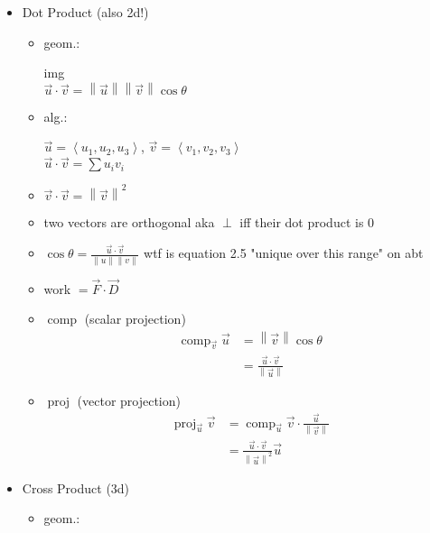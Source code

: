 \documentclass[11pt]{article}
\theoremstyle{definition}
\newcommand{\col}[1]{\begin{minipage}{\columnwidth}#1\end{minipage}}
\newcommand{\magn}[1]{\left\lVert #1 \right\rVert}
\DeclareMathOperator{\proj}{proj}
\DeclareMathOperator{\comp}{comp}
\begin{document}
\begin{multicols}{2}
  \col{
    \begin{itemize}
      \item Dot Product (also 2d!)
      \begin{itemize}
        \item geom.:
        
        img \\
        $\vec{u} \cdot \vec{v} = \magn{\vec{u}} \magn{\vec{v}}\cos \theta$
        \item alg.:
        
        $\vec{u} = \left< u_1, u_2, u_3 \right>$, 
        $\vec{v} = \left< v_1, v_2, v_3 \right>$\\
        $\vec{u} \cdot \vec{v} = \sum u_i v_i$
        \item $\vec{v}\cdot\vec{v} = \magn{\vec{v}}^2$
        \item two vectors are orthogonal aka $\perp$ iff their dot product is $0$
        \item $\displaystyle\cos \theta = \frac{\vec{u} \cdot \vec{v}}{\magn{u}\magn{v}}$ wtf is equation 2.5 "unique over this range" on abt
        \item work $= \vec{F} \cdot \vec{D}$
        \item $\comp$ (scalar projection)
        \begin{align*}
          \comp_{\vec{v}} \vec{u} & = \magn{\vec{v}} \cos \theta \\
          & = \frac{\vec{u} \cdot \vec{v}}{\magn{\vec{u}}}
        \end{align*}
        \item $\proj$ (vector projection)
        \begin{align*}
          \proj_{\vec{u}} \vec{v} &= \comp_{\vec{u}} \vec{v} \cdot \frac{\vec{u}}{\magn{\vec{v}}} \\
          &= \frac{\vec{u}\cdot\vec{v}}{\magn{\vec{u}}^2}\vec{u}
        \end{align*}
      \end{itemize}
    \end{itemize}
  }
  \col{
    \begin{itemize}
      \item Cross Product (3d)
      \begin{itemize}
        \item geom.:
        

\end{itemize}
\end{itemize}}
\end{multicols}
\end{document}
